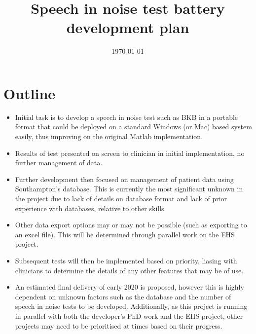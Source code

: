
\graphicspath{{./resources/}}
\hypersetup{colorlinks=true}   %


\frontmatter
\title      {Speech in noise test battery development plan}
\addresses  {\groupname\\\deptname\\\univname}
\date       {\today}
\subject    {}
\keywords   {}
\maketitle
\mainmatter
\section*{Outline}\label{Section:Introduction}
\begin{itemize}
    \item Initial task is to develop a speech in noise test such as BKB in a
        portable format that could be deployed on a standard Windows (or Mac)
        based system easily, thus improving on the original Matlab implementation.
    \item Results of test presented on screen to clinician in initial
        implementation, no further management of data.
    \item Further development then focused on management of patient data using
        Southampton's database. This is currently the most significant unknown
        in the project due to lack of details on database format and lack of
        prior experience with databases, relative to other skills.
    \item Other data export options may or may not be possible (such as
        exporting to an excel file). This will be determined through parallel
        work on the EHS project.
    \item Subsequent tests will then be implemented based on priority, liasing
        with clinicians to determine the details of any other features that may
        be of use.
    \item An estimated final delivery of early 2020 is proposed, however this
        is highly dependent on unknown factors such as the database and the
        number of speech in noise tests to be developed.  Additionally, as this
        project is running in parallel with both the developer's PhD work and
        the EHS project, other projects may need to be prioritised at times
        based on their progress.
\end{itemize}

